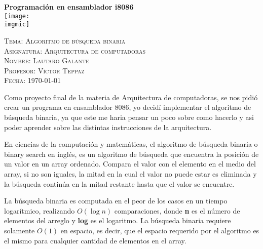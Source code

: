 \documentclass[a4paper,twoside]{article}
\newcommand{\imgmic}{./Img/i8086.jpg}
\begin{document}
  
  \begin{titlepage}
    \vfill
    \centering
    {\Huge \textbf{Programación en ensamblador i8086}} \\[4cm]
    \texttt{[image: \\imgmic]} \\[4cm]
    \begin{flushleft} 
      {\LARGE \textsc{Tema: Algoritmo de búsqueda binaria}} \\[2ex]
      {\LARGE \textsc{Asignatura: Arquitectura de computadoras}} \\[2ex]
      {\LARGE \textsc{Nombre: Lautaro Galante}} \\[2ex]
      {\LARGE \textsc{Profesor: Víctor Teppaz}} \\[2ex]
      {\LARGE \textsc{Fecha: \Large \today}}
    \end{flushleft}
  \end{titlepage}
  \thispagestyle{plain}
    \begin{center}
      {\Large Como proyecto final de la materia de Arquitectura de computadoras, se nos pidió 
        crear un programa en ensamblador 8086, yo decidí implementar el algoritmo de búsqueda binaria,
        ya que este me haria pensar un poco sobre como hacerlo y asi poder aprender sobre las 
        distintas instrucciones de la arquitectura.
      }
    \end{center}

    \begin{center}
      {\Large 

        En ciencias de la computación y matemáticas, el algoritmo de 
        búsqueda binaria o binary search en inglés, es un algoritmo de 
        búsqueda que encuentra la posición de un valor en un array 
        ordenado. Compara el valor con el elemento en el medio del 
        array, si no son iguales, la mitad en la cual el valor no 
        puede estar es eliminada y la búsqueda continúa en la mitad 
        restante hasta que el valor se encuentre.
      } 
    \end{center}
    
    \begin{center} 
      {\Large 
        La búsqueda binaria es computada en el peor de los casos en 
        un tiempo logarítmico, realizando \(O(\log n) \) comparaciones, 
        donde \textbf{n} es el número de elementos del arreglo y 
        \textbf{log} es el logaritmo.
        La búsqueda binaria requiere solamente \(O(1)\) en espacio, 
        es decir, que el espacio requerido por el algoritmo 
        es el mismo para cualquier cantidad de elementos en el array. 
      }
    \end{center}
    
\end{document}
